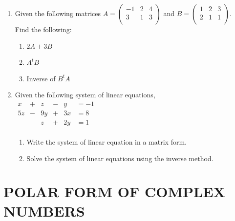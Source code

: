 \documentclass[11pt,a4paper]{article}
\begin{document}
\begin{enumerate}
\item Given the following matrices $A=
\begin{pmatrix}
-1 & 2 & 4\\
3 & 1 & 3\\
\end{pmatrix}
$ and $B=
\begin{pmatrix}
1 & 2 & 3\\
2 & 1 & 1\\
\end{pmatrix}
$.\\
Find the following:
\begin{enumerate}
\item $2A +3B$
\item $A^tB$
\item Inverse of $B^tA$\\
\end{enumerate}




\item Given the following system of linear equations,\\
$
\begin{matrix}
x & + & z & - & y & = -1\\
5z & - & 9y & +& 3x & = 8\\
&& z & + & 2y & =1\\
\end{matrix}
$\\

\begin{enumerate}
\item Write the system of linear equation in a matrix form.
\item Solve the system of linear equations using the inverse method.\\
\end{enumerate}
\end{enumerate}







\pagebreak
\section{POLAR FORM OF COMPLEX NUMBERS}

\begin{figure}[H]
\centering
{}
\end{figure}
\end{document}
